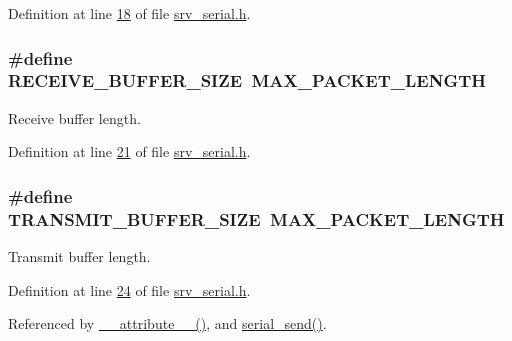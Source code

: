 Definition at line \hyperlink{a00031_source_l00018}{18} of file \hyperlink{a00031_source}{srv\+\_\+serial.\+h}.

\hypertarget{a00031_aa49ab378520c95fea987f93a7f3c9abf}{
\subsubsection[{R\+E\+C\+E\+I\+V\+E\+\_\+\+B\+U\+F\+F\+E\+R\+\_\+\+S\+I\+Z\+E}]{\setlength{\rightskip}{0pt plus 5cm}\#define R\+E\+C\+E\+I\+V\+E\+\_\+\+B\+U\+F\+F\+E\+R\+\_\+\+S\+I\+Z\+E~{\bf M\+A\+X\+\_\+\+P\+A\+C\+K\+E\+T\+\_\+\+L\+E\+N\+G\+T\+H}}}\label{a00031_aa49ab378520c95fea987f93a7f3c9abf}


Receive buffer length. 



Definition at line \hyperlink{a00031_source_l00021}{21} of file \hyperlink{a00031_source}{srv\+\_\+serial.\+h}.

\hypertarget{a00031_aef714b16a48390956c10e8aa18d156b8}{
\subsubsection[{T\+R\+A\+N\+S\+M\+I\+T\+\_\+\+B\+U\+F\+F\+E\+R\+\_\+\+S\+I\+Z\+E}]{\setlength{\rightskip}{0pt plus 5cm}\#define T\+R\+A\+N\+S\+M\+I\+T\+\_\+\+B\+U\+F\+F\+E\+R\+\_\+\+S\+I\+Z\+E~{\bf M\+A\+X\+\_\+\+P\+A\+C\+K\+E\+T\+\_\+\+L\+E\+N\+G\+T\+H}}}\label{a00031_aef714b16a48390956c10e8aa18d156b8}


Transmit buffer length. 



Definition at line \hyperlink{a00031_source_l00024}{24} of file \hyperlink{a00031_source}{srv\+\_\+serial.\+h}.



Referenced by \hyperlink{a00030_source_l00758}{\+\_\+\+\_\+attribute\+\_\+\+\_\+()}, and \hyperlink{a00030_source_l00577}{serial\+\_\+send()}.



